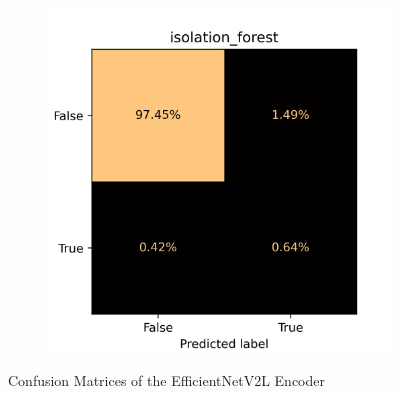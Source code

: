 \begin{figure}[!ht]
\begin{subfigure}{0.4\textwidth}
        \includegraphics[width=\textwidth]{./results/efficientnetv2l_vgg19/20230525_194238_isolation_forest_cm.png}
    \end{subfigure}
    \caption{Confusion Matrices of the EfficientNetV2L Encoder}
    \label{fig:efficientnetv2l_cm}
\end{figure}